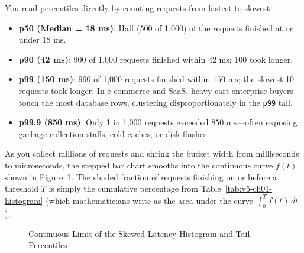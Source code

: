 You read percentiles directly by counting requests from fastest to slowest:
\begin{itemize}[leftmargin=18pt]
  \item \textbf{p50 (Median = 18 ms)}: Half (500 of 1,000) of the requests finished at or under $18\text{ ms}$.
  \item \textbf{p90 (42 ms)}: 900 of 1,000 requests finished within $42\text{ ms}$; 100 took longer.
  \item \textbf{p99 (150 ms)}: 990 of 1,000 requests finished within $150\text{ ms}$; the slowest 10 requests took longer. In e-commerce and SaaS, heavy-cart enterprise buyers touch the most database rows, clustering disproportionately in the \texttt{p99} tail.
  \item \textbf{p99.9 (850 ms)}: Only 1 in 1,000 requests exceeded $850\text{ ms}$---often exposing garbage-collection stalls, cold caches, or disk flushes.
\end{itemize}

As you collect millions of requests and shrink the bucket width from milliseconds to microseconds, the stepped bar chart smooths into the continuous curve $f(t)$ shown in Figure~\ref{fig:v5-ch01-latency-dist}. The shaded fraction of requests finishing on or before a threshold $T$ is simply the cumulative percentage from Table~\ref{tab:v5-ch01-histogram} (which mathematicians write as the area under the curve $\int_0^T f(t)\,dt$).

\begin{figure}[htbp]
\centering
{}
\caption{Continuous Limit of the Skewed Latency Histogram and Tail Percentiles}
\label{fig:v5-ch01-latency-dist}
\end{figure}

